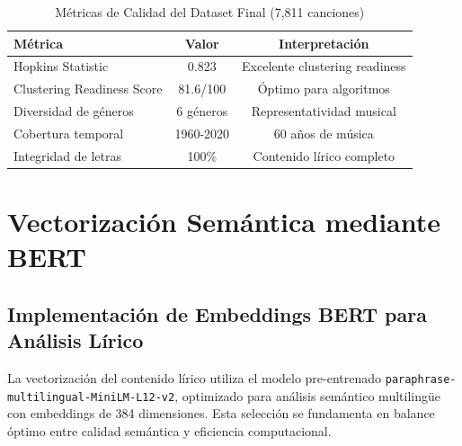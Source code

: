\documentclass[12pt,a4paper]{report}
\begin{document}
\begin{table}[H]
\centering
\caption{Métricas de Calidad del Dataset Final (7,811 canciones)}
\begin{tabular}{|l|c|c|}
\hline
\textbf{Métrica} & \textbf{Valor} & \textbf{Interpretación} \\
\hline
Hopkins Statistic & 0.823 & Excelente clustering readiness \\
\hline
Clustering Readiness Score & 81.6/100 & Óptimo para algoritmos \\
\hline
Diversidad de géneros & 6 géneros & Representatividad musical \\
\hline
Cobertura temporal & 1960-2020 & 60 años de música \\
\hline
Integridad de letras & 100\% & Contenido lírico completo \\
\hline
\end{tabular}
\end{table}

\section{Vectorización Semántica mediante BERT}

\subsection{Implementación de Embeddings BERT para Análisis Lírico}

La vectorización del contenido lírico utiliza el modelo pre-entrenado \texttt{paraphrase-multilingual-MiniLM-L12-v2}, optimizado para análisis semántico multilingüe con embeddings de 384 dimensiones. Esta selección se fundamenta en balance óptimo entre calidad semántica y eficiencia computacional.
\end{document}
